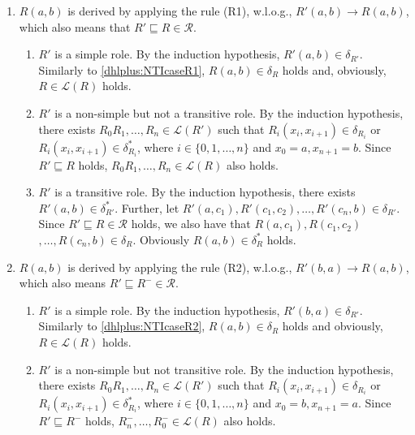 \begin{enumerate}[leftmargin=12ex,label=Case~2.\arabic*, ref=Case~2.\arabic*]
\item $R(a,b)$ is derived by applying the rule (R1), w.l.o.g., $R'(a,b)\rightarrow R(a,b)$,
    which also means that $R'\sqsubseteq R\in\mathcal{R}$.

    \begin{enumerate}[leftmargin=8ex,label=Case~2.1.\arabic*]
    \item $R'$ is a simple role. By the induction hypothesis, $R'(a,b)\in\delta_{R'}$.
        Similarly to \ref{dhlplus:NTIcaseR1}, $R(a,b)\in\delta_{R}$ holds and,
        obviously, $R\in\mathcal{L}(R)$ holds.

    \item $R'$ is a non-simple but not a transitive role.
        By the induction hypothesis, there exists $R_0R_1,\ldots ,R_n\in\mathcal{L}(R')$
        such that $R_i(x_i,x_{i+1})\in\delta_{R_i}$ or $R_i(x_i,x_{i+1})\in\delta^*_{R_i}$, where $i\in\{0,1,\ldots ,n\}$
        and $x_0=a, x_{n+1}=b$. Since $R'\sqsubseteq R$ holds, $R_0R_1,\ldots ,R_n\in\mathcal{L}(R)$ also holds.

    \item $R'$ is a transitive role.
        By the induction hypothesis, there exists $R'(a,b)\in\delta^*_{R'}$.
        Further, let $R'(a,c_1),R'(c_1,c_2),\ldots ,R'(c_n,b)\in\delta_{R'}$.
        Since $R'\sqsubseteq R\in\mathcal{R}$ holds, we also have that
        $R(a,c_1),R(c_1,c_2)$ $,\ldots ,R(c_n,b)\in\delta_{R}$. Obviously $R(a,b)\in\delta^*_{R}$ holds.
    \end{enumerate}

\item $R(a,b)$ is derived by applying the rule (R2), w.l.o.g., $R'(b,a)\rightarrow R(a,b)$,
    which also means $R'\sqsubseteq R^-\in\mathcal{R}$.

    \begin{enumerate}[leftmargin=8ex,label=Case~2.2.\arabic*]
    \item $R'$ is a simple role. By the induction hypothesis, $R'(b,a)\in\delta_{R'}$.
        Similarly to \ref{dhlplus:NTIcaseR2}, $R(a,b)\in\delta_{R}$ holds and
        obviously, $R\in\mathcal{L}(R)$ holds.

    \item $R'$ is a non-simple but not transitive role. By the induction hypothesis, there exists $R_0R_1,\ldots ,R_n\in\mathcal{L}(R')$
        such that $R_i(x_i,x_{i+1})\in\delta_{R_i}$ or $R_i(x_i,x_{i+1})\in\delta^*_{R_i}$, where $i\in\{0,1,\ldots ,n\}$
        and $x_0=b, x_{n+1}=a$. Since $R'\sqsubseteq R^-$ holds, $R_n^-,\ldots ,R_0^-\in\mathcal{L}(R)$ also holds.


\end{enumerate}
\end{enumerate}
